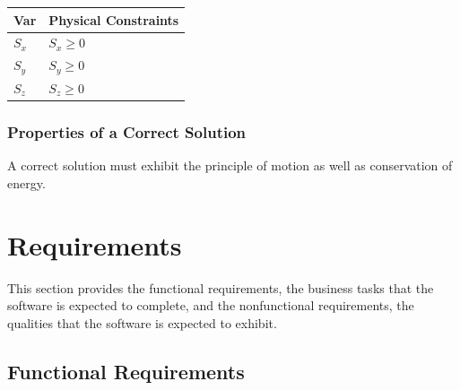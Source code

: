 \documentclass[12pt]{article}
\begin{document}
	\begin{table}[!h]
		\caption{Output Variables} \label{TblOutputVar}
		\renewcommand{\arraystretch}{1.2}
		\noindent \begin{longtable*}{l l} 
			\toprule
			\textbf{Var} & \textbf{Physical Constraints} \\
			\midrule 
			$S_{x}$ & $S_{x} \geq 0$
			\\
			$S_{y}$ & $S_{y} \geq 0$
			\\
			$S_{z}$ & $S_{z} \geq 0$
			\\
			\bottomrule
		\end{longtable*}
	\end{table}
	
	\subsubsection{Properties of a Correct Solution} \label{sec_CorrectSolution}
	
	\noindent
	A correct solution must exhibit the principle of motion as well as conservation of energy.
	
	\section{Requirements}
	
	This section provides the functional requirements, the business tasks that the
	software is expected to complete, and the nonfunctional requirements, the
	qualities that the software is expected to exhibit.
	
	\subsection{Functional Requirements}
	
\end{document}
